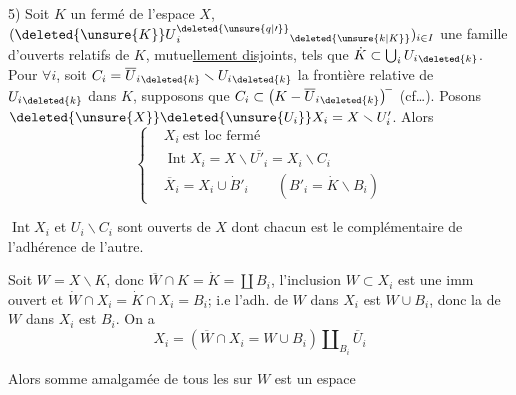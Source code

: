 
5) Soit $K$ un fermé de l'espace $X$, $(\deleted{\unsure{K}}U{}^{\deleted{\unsure{q|\prime}}}_i{}_{\deleted{\unsure{k|K}}})_{i\in I}$ une famille d'ouverts relatifs de $K$, mutue\uline{llement disj}oints, tels que $\dot K\subset\bigcup_i U_i{}_{\deleted{k}}$.   Pour $\forall i$, soit $C_i=\overline U_i{}_{\deleted{k}}\smallsetminus U_i{}_{\deleted{k}}$ la frontière relative de $U_i{}_{\deleted{k}}$ dans $K$, supposons que $C_i\subset\bigl(K-\overline U_i{}_{\deleted{k}}\bigr)^{\! -}$ (cf\ldots). Posons $\deleted{\unsure{X}}\deleted{\unsure{U_i}}X_i=X\smallsetminus U'_i$. Alors
\[
\left\{\begin{aligned}
&X_i\ \text{est loc fermé}\\
&\operatorname{Int}X_i=X\smallsetminus\overline{U'_i}=X_i\smallsetminus C_i\\
&\overline X_i=X_i\cup \dot B'_i\qquad(B'_i=\dot K\smallsetminus B_i)
\end{aligned}\right.
\]

$\operatorname{Int}X_i$ et \uline{$U_i\smallsetminus C_i$} sont  ouverts de $X$ dont chacun est le complémentaire de l'adhérence de l'autre.

Soit $W=X\smallsetminus K$,  donc  $\overline W\cap K=\dot K=\coprod B_i$, l'inclusion $W\subset X_i$ est une imm ouvert et $\dot W\cap X_i=\dot K\cap X_i=B_i$;  i.e  l'adh. de $W$ dans $X_i$ est $W\cup B_i$, donc la  de $W$ dans $X_i$ est $B_i$. On a
\[
X_i=(\overline W\cap X_i=W\cup B_i)\amalg_{B_i}\overline U_i
\]


Alors  somme amalgamée de tous les  sur $W$ est un espace
